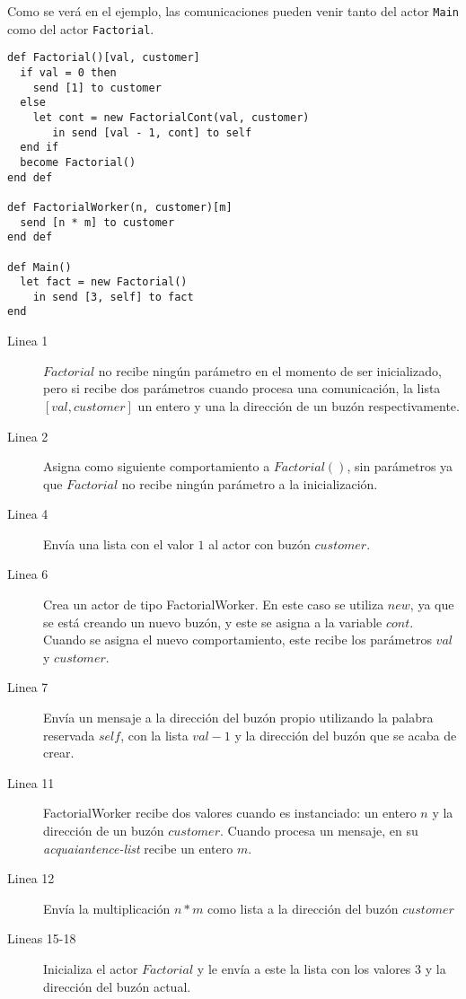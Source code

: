 Como se verá en el ejemplo, las comunicaciones pueden venir tanto del actor \lstinline[language=sal, style=simple]$Main$ como del actor \lstinline[language=sal, style=simple]$Factorial$.

\begin{lstlisting}[language=sal, style=simple]
def Factorial()[val, customer]
  if val = 0 then
    send [1] to customer
  else
    let cont = new FactorialCont(val, customer)
       in send [val - 1, cont] to self
  end if 
  become Factorial()
end def

def FactorialWorker(n, customer)[m] 
  send [n * m] to customer
end def

def Main() 
  let fact = new Factorial() 
    in send [3, self] to fact
end
\end{lstlisting}

\begin{description}

\item [Linea 1] $Factorial$ no recibe ningún parámetro en el momento de ser inicializado, pero si recibe dos parámetros cuando procesa una comunicación, la lista $[val, customer]$ un entero y una la dirección de un buzón respectivamente.
\item [Linea 2] Asigna como siguiente comportamiento a $Factorial()$, sin parámetros ya que $Factorial$ no recibe ningún parámetro a la inicialización.  
\item [Linea 4] Envía una lista con el valor $1$ al actor con buzón $customer$.
\item [Linea 6] Crea un actor de tipo FactorialWorker. En este caso se utiliza $new$, ya que se está creando un nuevo buzón, y este se asigna a la variable $cont$. Cuando se asigna el nuevo comportamiento, este recibe los parámetros $val$ y $customer$.
\item [Linea 7] Envía un mensaje a la dirección del buzón propio utilizando la palabra reservada $self$, con la lista $val - 1$ y la dirección del buzón que se acaba de crear.
\item [Linea 11] FactorialWorker recibe dos valores cuando es instanciado: un entero $n$ y la dirección de un buzón $customer$. Cuando procesa un mensaje, en su \textit{acquaiantence-list} recibe un entero $m$.
\item [Linea 12] Envía la multiplicación $n*m$ como lista a la dirección del buzón $customer$ 
\item [Lineas 15-18] Inicializa el actor $Factorial$ y le envía a este la lista con los valores $3$ y la dirección del buzón actual. 

\end{description}

